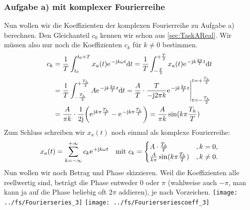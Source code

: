 \documentclass[11pt,a4paper,DIV=12]{scrartcl}
\newcommand{\diff}{\mathrm{d}}
\begin{document}
\subsubsection*{Aufgabe a) mit komplexer Fourierreihe}
Nun wollen wir die Koeffizienten der komplexen Fourierreihe zu Aufgabe a) berechnen. Den Gleichanteil $c_0$ kennen wir schon aus \ref{sec:TaskAReal}.
Wir müssen also nur noch die Koeffizienten $c_k$ für $k\neq 0$ bestimmen.
\begin{align}
	c_k&=\frac{1}{T}\int_{t_0}^{t_0+T}x_{a}(t)\e^{-\im k \omega t}\diff t=\frac{1}{T}\int_{-\frac{T}{2}}^{+\frac{T}{2}}x_a(t)\e^{-\im k \frac{2\pi}{T}t}\diff t\nonumber\\
	&=\frac{1}{T}\int_{-\frac{T_h}{2}}^{+\frac{T_h}{2}}A\e^{-\im k \frac{2\pi}{T}t}\diff t=\frac{A}{T}\cdot\frac{T}{-\im 2\pi k}\e^{-\im k \frac{2\pi}{T}t}\Bigg |_{t=-\frac{T_h}{2}}^{t=+\frac{T_h}{2}}\nonumber\\
	&=\frac{A}{\pi k}\cdot\frac{1}{2\im}\bigg (\e^{\im k \pi \frac{T_h}{T}}-\e^{-\im k \pi \frac{T_h}{T}}\bigg )=\frac{A}{\pi k}\sin(k\pi\frac{T_h}{T})
\end{align}
Zum Schluss schreiben wir $x_{a}(t)$ noch einmal als komplexe Fourierreihe:
\begin{align}
	x_{a}(t)=\sum_{k=-\infty}^{+\infty}c_k\e^{+\im k \omega t}\quad\text{mit }c_k=\begin{cases}
		A\cdot\frac{T_h}{T} &,k=0,\\
		\frac{A}{k\pi}\sin(k\pi\frac{T_h}{T}) &,k\neq0.
	\end{cases}
\end{align}
Nun wollen wir noch Betrag und Phase skizzieren. Weil die Koeffizienten alle reellwertig sind, beträgt die Phase entweder $0$ oder $\pi$ (wahlweise auch $-\pi$, man kann ja auf die Phase beliebig oft $2\pi$ addieren), je nach Vorzeichen.
\newpage
\texttt{[image: ../fs/Fourierseries\_3]}
\texttt{[image: ../fs/Fourierseriescoeff\_3]}
\newpage
\end{document}
